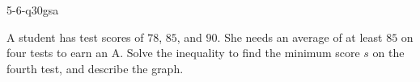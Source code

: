 \begin{practiceQuestion}{5-6-q30}{gsa}
\begin{questionText}
A student has test scores of $78$, $85$, and $90$. She needs an average of at least $85$ on four tests to earn an A. Solve the inequality to find the minimum score $s$ on the fourth test, and describe the graph.

\begin{center}
\end{center}
\end{questionText}
\end{practiceQuestion}
